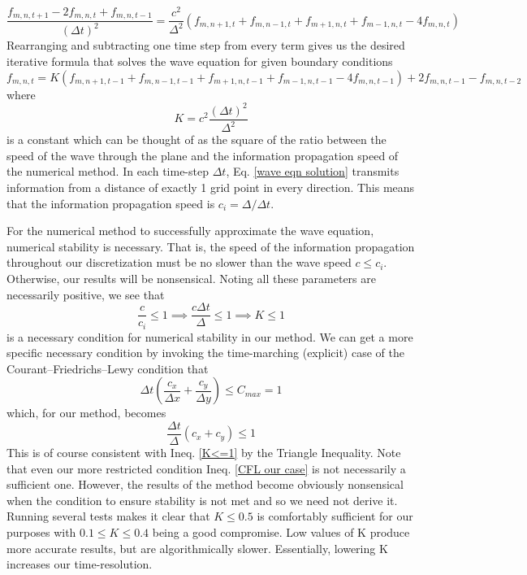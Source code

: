 \documentclass{article}
\begin{document}
\begin{equation*}
\frac{f_{m,n,t+1}-2f_{m,n,t}+f_{m,n,t-1}}{(\Delta t)^2}=\frac{c^2}{\Delta^2}(f_{m,n+1,t}+f_{m,n-1,t}+f_{m+1,n,t}+f_{m-1,n,t}-4f_{m,n,t})
\end{equation*}
Rearranging and subtracting one time step from every term gives us the desired iterative formula that solves the wave equation for given boundary conditions
\begin{equation} \label{wave eqn solution}
\boxed{f_{m,n,t}=K(f_{m,n+1,t-1}+f_{m,n-1,t-1}+f_{m+1,n,t-1}+f_{m-1,n,t-1}-4f_{m,n,t-1})+2f_{m,n,t-1}-f_{m,n,t-2}}
\end{equation}
where
\begin{equation} \label{K}
K=c^2\frac{(\Delta t)^2}{\Delta^2}
\end{equation}
is a constant which can be thought of as the square of the ratio between the speed of the wave through the plane and the information propagation speed of the numerical method. In each time-step $\Delta t$, Eq. \ref{wave eqn solution} transmits information from a distance of exactly 1 grid point in every direction. This means that the information propagation speed is $c_{i}=\Delta / \Delta t$.

For the numerical method to successfully approximate the wave equation, numerical stability is necessary. That is, the speed of the information propagation throughout our discretization must be no slower than the wave speed $c\leq c_i$. Otherwise, our results will be nonsensical. Noting all these parameters are necessarily positive, we see that
\begin{equation} \label{K<=1}
\frac{c}{c_i}\leq 1 \implies \frac{c\Delta t}{\Delta}\leq 1 \implies K\leq 1
\end{equation}
is a necessary condition for numerical stability in our method. We can get a more specific necessary condition by invoking the time-marching (explicit) case of the Courant--Friedrichs--Lewy condition that
\begin{equation}
\Delta t\left(\frac{c_x}{\Delta x}+\frac{c_y}{\Delta y}\right)\leq C_{max}=1
\end{equation}
which, for our method, becomes
\begin{equation} \label{CFL our case}
\frac{\Delta t}{\Delta}(c_x+c_y)\leq 1
\end{equation}
This is of course consistent with Ineq. \ref{K<=1} by the Triangle Inequality. Note that even our more restricted condition Ineq. \ref{CFL our case} is not necessarily a sufficient one. However, the results of the method become obviously nonsensical when the condition to ensure stability is not met and so we need not derive it. Running several tests makes it clear that $K\leq 0.5$ is comfortably sufficient for our purposes with $0.1\leq K\leq 0.4$ being a good compromise. Low values of K produce more accurate results, but are algorithmically slower. Essentially, lowering K increases our time-resolution.
\end{document}

